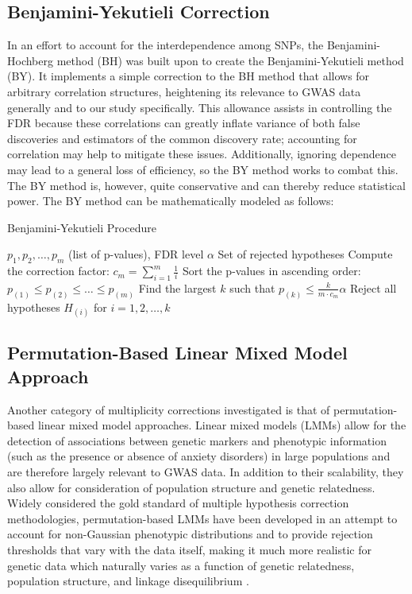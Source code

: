 \documentclass[12pt]{article}
\begin{document}
\subsection{Benjamini-Yekutieli Correction}
In an effort to account for the interdependence among SNPs, the Benjamini-Hochberg method (BH) was built upon to create the Benjamini-Yekutieli method (BY). It implements a simple correction to the BH method that allows for arbitrary correlation structures, heightening its relevance to GWAS data generally and to our study specifically. This allowance assists in controlling the FDR because these correlations can greatly inflate variance of both false discoveries and estimators of the common discovery rate; accounting for correlation may help to mitigate these issues. Additionally, ignoring dependence may lead to a general loss of efficiency, so the BY method works to combat this. The BY method is, however, quite conservative and can thereby reduce statistical power. The BY method can be mathematically modeled as follows: \par

\begin{algorithm}
    \caption{Benjamini-Yekutieli Procedure}
    \begin{algorithmic}[1]
        \Require $p_1, p_2, \dots, p_m$ (list of p-values), FDR level $\alpha$
        \Ensure Set of rejected hypotheses
        \State Compute the correction factor: $c_m = \sum_{i=1}^{m} \frac{1}{i}$
        \State Sort the p-values in ascending order: $p_{(1)} \leq p_{(2)} \leq \dots \leq p_{(m)}$
        \State Find the largest $k$ such that $p_{(k)} \leq \frac{k}{m \cdot c_m} \alpha$
        \State Reject all hypotheses $H_{(i)}$ for $i = 1, 2, \dots, k$
    \end{algorithmic}
\end{algorithm}


\subsection{Permutation-Based Linear Mixed Model Approach}
Another category of multiplicity corrections investigated is that of permutation-based linear mixed model approaches. Linear mixed models (LMMs) allow for the detection of associations between genetic markers and phenotypic information (such as the presence or absence of anxiety disorders) in large populations and are therefore largely relevant to GWAS data. In addition to their scalability, they also allow for consideration of population structure and genetic relatedness. Widely considered the gold standard of multiple hypothesis correction methodologies, permutation-based LMMs have been developed in an attempt to account for non-Gaussian phenotypic distributions and to provide rejection thresholds that vary with the data itself, making it much more realistic for genetic data which naturally varies as a function of genetic relatedness, population structure, and linkage disequilibrium \cite{Jiang2024}. \par
\end{document}
